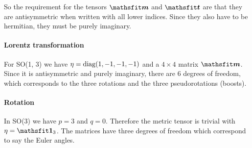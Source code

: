 \documentclass[11pt, english, fleqn, DIV=15, headinclude, BCOR=1cm]{scrartcl}
\begin{document}
So the requirement for the tensors $\tens m$ and $\tens t$ are that they are
antisymmetric when written with all lower indices. Since they also have to be
hermitian, they must be purely imaginary.

\paragraph{Lorentz transformation}

For SO(1, 3) we have $\eta = \operatorname{diag}(1, -1, -1, -1)$ and a $4\times 4$ matrix
$\tens m$. Since it is antisymmetric and purely imaginary, there are 6 degrees
of freedom, which corresponds to the three rotations and the three
pseudorotations (boosts).

\paragraph{Rotation}

In SO(3) we have $p = 3$ and $q = 0$. Therefore the metric tensor is trivial
with $\eta = \tens 1_3$. The matrices have three degrees of freedom which
correspond to say the Euler angles.
\end{document}
